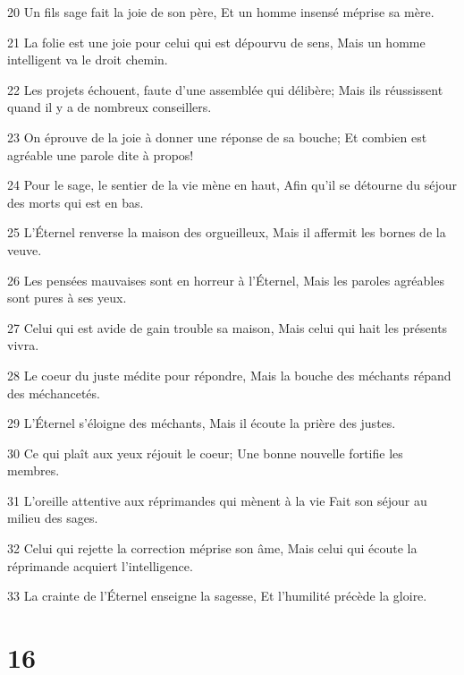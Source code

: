 \par 20 Un fils sage fait la joie de son père, Et un homme insensé méprise sa mère.
\par 21 La folie est une joie pour celui qui est dépourvu de sens, Mais un homme intelligent va le droit chemin.
\par 22 Les projets échouent, faute d'une assemblée qui délibère; Mais ils réussissent quand il y a de nombreux conseillers.
\par 23 On éprouve de la joie à donner une réponse de sa bouche; Et combien est agréable une parole dite à propos!
\par 24 Pour le sage, le sentier de la vie mène en haut, Afin qu'il se détourne du séjour des morts qui est en bas.
\par 25 L'Éternel renverse la maison des orgueilleux, Mais il affermit les bornes de la veuve.
\par 26 Les pensées mauvaises sont en horreur à l'Éternel, Mais les paroles agréables sont pures à ses yeux.
\par 27 Celui qui est avide de gain trouble sa maison, Mais celui qui hait les présents vivra.
\par 28 Le coeur du juste médite pour répondre, Mais la bouche des méchants répand des méchancetés.
\par 29 L'Éternel s'éloigne des méchants, Mais il écoute la prière des justes.
\par 30 Ce qui plaît aux yeux réjouit le coeur; Une bonne nouvelle fortifie les membres.
\par 31 L'oreille attentive aux réprimandes qui mènent à la vie Fait son séjour au milieu des sages.
\par 32 Celui qui rejette la correction méprise son âme, Mais celui qui écoute la réprimande acquiert l'intelligence.
\par 33 La crainte de l'Éternel enseigne la sagesse, Et l'humilité précède la gloire.

\chapter{16}

